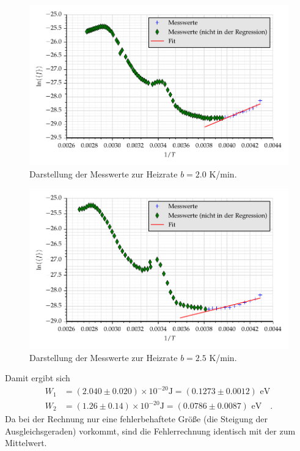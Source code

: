 \begin{figure}[h]
\centering
\includegraphics[scale=0.8]{../skript/G1.pdf}
\caption{Darstellung der Messwerte zur Heizrate $b=2.0$ K/min.}
\label{fig:G1}
\end{figure}
\begin{figure}[h]
\centering
\includegraphics[scale=0.8]{../skript/G2.pdf}
\caption{Darstellung der Messwerte zur Heizrate $b=2.5$ K/min.}
\label{fig:G2}
\end{figure}



Damit ergibt sich
\begin{align}
W_1&= (2.040 \pm 0.020)\times 10^{-20}\text{J}=(0.1273\pm0.0012)\text{ eV}\\
W_2&=  (1.26 \pm 0.14) \times 10^{-20}\text{J}=(0.0786\pm 0.0087)\text{ eV}\quad .
\end{align}
Da bei der Rechnung nur eine fehlerbehaftete Größe (die Steigung der 
Ausgleichsgeraden) vorkommt, sind die Fehlerrechnung identisch mit der 
zum Mittelwert.
